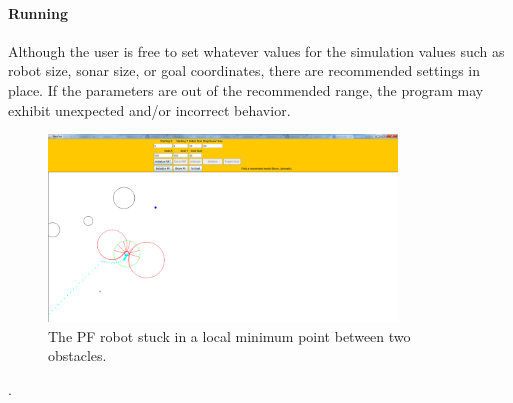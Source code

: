 \documentclass[12pt]{article}
\begin{document}
\paragraph*{Running}
Although the user is free to set whatever values for the simulation values such as robot size, sonar size, or goal coordinates, there are recommended settings in place. If the parameters are out of the recommended range, the program may exhibit unexpected and/or incorrect behavior.


\begin{figure}
\centering
\includegraphics[width=350]{two_obstacles.png}
\caption{The PF robot stuck in a local minimum point between two obstacles.}
\end{figure}.
\end{document}

